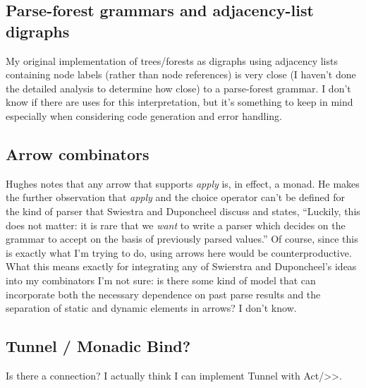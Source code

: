\documentclass[12pt]{article}
\begin{document}
\subsection{Parse-forest grammars and adjacency-list digraphs}
\label{sec:parse-forest_grammars_adjacency-list_digraphs}

My original implementation of trees/forests as digraphs using
adjacency lists containing node labels (rather than node references)
is very close (I haven't done the detailed analysis to determine how
close) to a parse-forest grammar.  I don't know if there are uses for
this interpretation, but it's something to keep in mind especially
when considering code generation and error handling.


\subsection{Arrow combinators}
\label{sec:arrow_combinators}

Hughes notes that any arrow that supports \emph{apply} is, in effect,
a monad.  He makes the further observation that \emph{apply} and the
choice operator can't be defined for the kind of parser that Swiestra
and Duponcheel discuss and states, ``Luckily, this does not matter: it
is rare that we \emph{want} to write a parser which decides on the
grammar to accept on the basis of previously parsed values.''  Of
course, since this is exactly what I'm trying to do, using arrows here
would be counterproductive.  What this means exactly for integrating
any of Swierstra and Duponcheel's ideas into my combinators I'm not
sure: is there some kind of model that can incorporate both the
necessary dependence on past parse results and the separation of
static and dynamic elements in arrows?  I don't know.


\subsection{Tunnel / Monadic Bind?}
\label{sec:tunnel_bind}

Is there a connection?  I actually think I can implement Tunnel with
Act/>>.



\printbibliography
\end{document}

